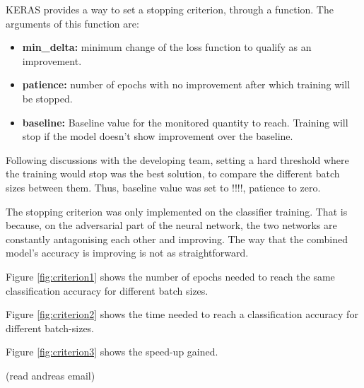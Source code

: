 KERAS provides a way to set a stopping criterion, through a function. The arguments of this function are:
\begin{itemize}
    \item \textbf{min\_delta:} minimum change of the loss function to qualify as an improvement.
    \item \textbf{patience:} number of epochs with no improvement after which training will be stopped.
    \item \textbf{baseline:} Baseline value for the monitored quantity to reach. Training will stop if the model doesn't show improvement over the baseline.  
\end{itemize}

Following discussions with the developing team, setting a hard threshold where the training would stop was the best solution, to compare the different batch sizes between them. Thus, baseline value was set to !!!!, patience to zero. 


The stopping criterion was only implemented on the classifier training. That is because, on the adversarial part of the neural network, the two networks are constantly antagonising each other and improving. The way that the combined model's accuracy is improving is not as straightforward.


Figure \ref{fig:criterion1} shows the number of epochs needed to reach the same classification accuracy for different batch sizes.

Figure \ref{fig:criterion2} shows the time needed to reach a classification accuracy for different batch-sizes.

Figure \ref{fig:criterion3} shows the speed-up gained.

(read andreas email)

